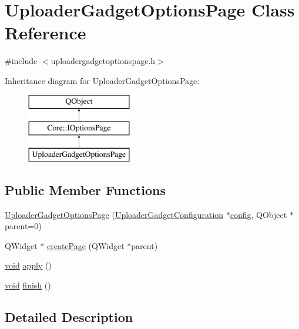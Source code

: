\hypertarget{class_uploader_gadget_options_page}{\section{Uploader\-Gadget\-Options\-Page Class Reference}
\label{class_uploader_gadget_options_page}
}


{\ttfamily \#include $<$uploadergadgetoptionspage.\-h$>$}

Inheritance diagram for Uploader\-Gadget\-Options\-Page\-:\begin{figure}[H]
\begin{center}
\leavevmode
\includegraphics[height=3.000000cm]{class_uploader_gadget_options_page}
\end{center}
\end{figure}
\subsection*{Public Member Functions}
\begin{DoxyCompactItemize}
\item 
\hyperlink{group___y_modem_uploader_gae4988774405776fb8a06744eb25e596a}{Uploader\-Gadget\-Options\-Page} (\hyperlink{class_uploader_gadget_configuration}{Uploader\-Gadget\-Configuration} $\ast$\hyperlink{deflate_8c_a4473b5227787415097004fd39f55185e}{config}, Q\-Object $\ast$parent=0)
\item 
Q\-Widget $\ast$ \hyperlink{group___y_modem_uploader_ga8f7e89743cc3fc8f9e866c4ebe859a9f}{create\-Page} (Q\-Widget $\ast$parent)
\item 
\hyperlink{group___u_a_v_objects_plugin_ga444cf2ff3f0ecbe028adce838d373f5c}{void} \hyperlink{group___y_modem_uploader_gaf95a5398d31a86f095fc23d1e7fa878f}{apply} ()
\item 
\hyperlink{group___u_a_v_objects_plugin_ga444cf2ff3f0ecbe028adce838d373f5c}{void} \hyperlink{group___y_modem_uploader_ga85b693be9a5e923d0d5bd7f1c0c50fe9}{finish} ()
\end{DoxyCompactItemize}


\subsection{Detailed Description}


